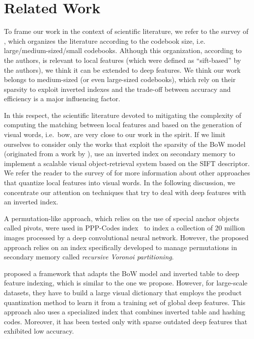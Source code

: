 \section{Related Work}
\label{sec:str:related-work}
To frame our work in the context of scientific literature, we refer to the survey of \citet{zheng2018sift}, which organizes the literature according to the codebook size, i.e. large/medium-sized/small codebooks.
Although this organization, according to the authors, is relevant to local features (which were defined as ``sift-based'' by the authors), we think it can be extended to deep features.
We think our work belongs to medium-sized (or even large-sized codebooks), which rely on their sparsity to exploit inverted indexes and the trade-off between accuracy and efficiency is a major influencing factor.

In this respect, the scientific literature devoted to mitigating the complexity of computing the matching between local features and based on the generation of visual words, i.e.\ \acrfull{bow}, are very close to our work in the spirit.
If we limit ourselves to consider only the works that exploit the sparsity of the BoW model (originated from a work by \citet{sivic2003video}), \citet{philbin2007object} use an inverted index on secondary memory to implement a scalable visual object-retrieval system based on the SIFT descriptor.
We refer the reader to the survey of \citet{zheng2018sift} for more information about other approaches that quantize local features into visual words.
In the following discussion, we concentrate our attention on techniques that try to deal with deep features with an inverted index.

A permutation-like approach, which relies on the use of special anchor objects called pivots, were used in PPP-Codes index~\cite{novak2015large} to index a collection of 20 million images processed by a deep convolutional neural network.
However, the proposed approach relies on an index specifically developed to manage permutations in secondary memory called \emph{recursive Voronoi partitioning}.

\citet{liu2015indexing} proposed a framework that adapts the BoW model and inverted table to deep feature indexing, which is similar to the one we propose.
However, for large-scale datasets, they have to build a large visual dictionary that employs the product quantization method to learn it from a training set of global deep features.
This approach also uses a specialized index that combines inverted table and hashing codes.
Moreover, it has been tested only with sparse outdated deep features that exhibited low accuracy.


